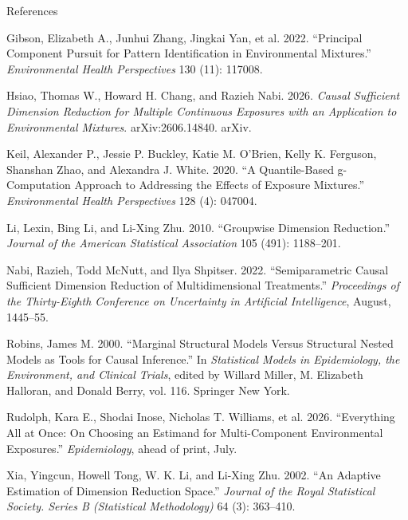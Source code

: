 \documentclass[
  ignorenonframetext,
  aspectratio=169,
  11pt]{beamer}
\newlength{\cslhangindent}
\newenvironment{CSLReferences}[2] %
 {\begin{list}{}{%
  \setlength{\itemindent}{0pt}
  \setlength{\leftmargin}{0pt}
  \setlength{\parsep}{0pt}
  \ifodd #1
   \setlength{\leftmargin}{\cslhangindent}
   \setlength{\itemindent}{-1\cslhangindent}
  \fi
  \setlength{\itemsep}{#2\baselineskip}}}
 {\end{list}}
\begin{document}
\begin{frame}[allowframebreaks]{References}
\begin{CSLReferences}{1}{1}
Gibson, Elizabeth A., Junhui Zhang, Jingkai Yan, et al. 2022.
{``Principal {Component Pursuit} for {Pattern Identification} in
{Environmental Mixtures}.''} \emph{Environmental Health Perspectives}
130 (11): 117008.

Hsiao, Thomas W., Howard H. Chang, and Razieh Nabi. 2026. \emph{Causal
{Sufficient Dimension Reduction} for {Multiple Continuous Exposures}
with an {Application} to {Environmental Mixtures}}. arXiv:2606.14840.
arXiv.

Keil, Alexander P., Jessie P. Buckley, Katie M. O'Brien, Kelly K.
Ferguson, Shanshan Zhao, and Alexandra J. White. 2020. {``A
{Quantile-Based} g-{Computation Approach} to {Addressing} the {Effects}
of {Exposure Mixtures}.''} \emph{Environmental Health Perspectives} 128
(4): 047004.

Li, Lexin, Bing Li, and Li-Xing Zhu. 2010. {``Groupwise {Dimension
Reduction}.''} \emph{Journal of the American Statistical Association}
105 (491): 1188--201.

Nabi, Razieh, Todd McNutt, and Ilya Shpitser. 2022. {``Semiparametric
Causal Sufficient Dimension Reduction of Multidimensional Treatments.''}
\emph{Proceedings of the {Thirty-Eighth Conference} on {Uncertainty} in
{Artificial Intelligence}}, August, 1445--55.

Robins, James M. 2000. {``Marginal {Structural Models} Versus
{Structural} Nested {Models} as {Tools} for {Causal} Inference.''} In
\emph{Statistical {Models} in {Epidemiology}, the {Environment}, and
{Clinical Trials}}, edited by Willard Miller, M. Elizabeth Halloran, and
Donald Berry, vol. 116. Springer New York.

Rudolph, Kara E., Shodai Inose, Nicholas T. Williams, et al. 2026.
{``Everything {All} at {Once}: {On Choosing} an {Estimand} for
{Multi}-Component {Environmental Exposures}.''} \emph{Epidemiology},
ahead of print, July.

Xia, Yingcun, Howell Tong, W. K. Li, and Li-Xing Zhu. 2002. {``An
{Adaptive Estimation} of {Dimension Reduction Space}.''} \emph{Journal
of the Royal Statistical Society. Series B (Statistical Methodology)} 64
(3): 363--410.

\end{CSLReferences}
\end{frame}
\end{document}
